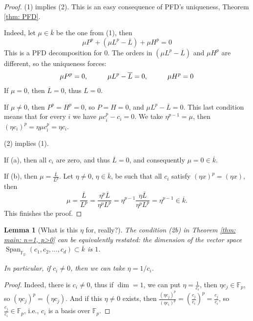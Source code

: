 \documentclass{amsart}
\newcommand{\op}{\operatorname}
\newtheorem{lemma}[thm]{Lemma}
\theoremstyle{definition}
\begin{document}
\begin{proof}
    (1) implies (2). 
    This is an easy consequence of PFD's uniqueness, Theorem \ref{thm: PFD}. 
    
    Indeed, let $\mu\in \overline{k}$ be the one from (1), then
    \[
    \mu P^p+ (\mu L^p-\overline{L})+ \mu H^p =0
    \]
    This is a PFD decomposition for $0$. The orders in $(\mu L^p-\overline{L})$ and $\mu H^p$ are different, so the uniqueness forces:
    \[
    \mu P^p=0, \hspace{1 cm}  \mu L^p-\overline{L}=0, \hspace{1 cm} \mu H^p=0
    \]
    If $\mu=0$, then $\overline{L}=0$, thus $L=0$.

    If $\mu\ne 0$, then $P^p=H^p=0$, so $P=H=0$, and $\mu L^p-\overline{L}=0$. This last condition means that for every $i$ we have $\mu c_i^p-c_i=0$. We take $\eta^{p-1}=\mu$, then $(\eta c_i)^p=\eta\mu c_i^p=\eta c_i$. 

    (2) implies (1). 
    
    If (a), then all $c_i$ are zero, and thus $\overline{L}=0$, and consequently $\mu=0\in \overline{k}$.

    If (b), then $\mu =\frac{\overline{L}}{L^p}$. Let $\eta \ne 0$, $\eta \in \overline{k}$, be such that all $c_i$ satisfy $(\eta x)^{p}=(\eta x)$, then
    \[
    \mu=\frac{\overline{L}}{L^p}=\frac{\eta^p\overline{L}}{\eta^p L^p}=\eta^{p-1}\frac{\eta\overline{L}}{\eta^{p} L^p}=\eta^{p-1}\in \overline{k}.
    \]
    This finishes the proof.
\end{proof}

\begin{lemma}[What is this $\eta$ for, really?]\label{lemma: n=1, p>0, eta meaning}
    The condition (2b) in Theorem \ref{thm: main: n=1, p>0} can be equivalently restated: 
    the dimension of the vector space $\op{Span}_\mathbb{\mathbb{F}_p}(c_1,c_2,\ldots,c_d)\subset \overline{k}$ is $1$.

    In particular, if $c_i\ne0$, then we can take $\eta=1/c_i$.
\end{lemma}

\begin{proof}
    Indeed, there is $c_i\ne 0$, thus if $\op{dim}=1$, we can put $\eta=\frac{1}{c_i}$, then $\eta c_j\in\mathbb{F}_p$, so $(\eta c_j)^{p}=(\eta c_j)$. And if this $\eta \ne0$ exists, then $\frac{(\eta c_j)^{p}}{(\eta c_i)^{p}}=\left(\frac{c_j}{c_i}\right)^p=\frac{c_j}{c_i}$, so $\frac{c_j}{c_i}\in \mathbb{F}_p$, i.e., $c_i$ is a basis over $\mathbb{F}_p$.
\end{proof}
\end{document}

